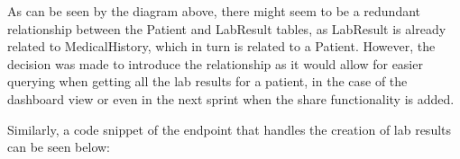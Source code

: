 \noindent\begin{minipage}{\textwidth}
  \begin{center}
      \label{fig:erd_s5}
  \end{center}
\end{minipage}

\FloatBarrier{}

As can be seen by the diagram above, there might seem to be a redundant relationship between the Patient and LabResult tables, as LabResult is already related to MedicalHistory, which in turn is related to a Patient. However, the decision was made to introduce the relationship as it would allow for easier querying when getting all the lab results for a patient, in the case of the dashboard view or even in the next sprint when the share functionality is added.

Similarly, a code snippet of the endpoint that handles the creation of lab results can be seen below:

